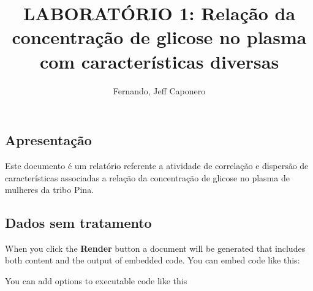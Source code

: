 \documentclass[
  letterpaper,
  DIV=11,
  numbers=noendperiod]{scrartcl}
\title{LABORATÓRIO 1: Relação da concentração de glicose no plasma com
características diversas}
\author{Fernando, Jeff Caponero}
\date{}
\begin{document}
\maketitle
\ifdefined\Shaded\renewenvironment{Shaded}{\begin{tcolorbox}[frame hidden, boxrule=0pt, enhanced, sharp corners, borderline west={3pt}{0pt}{shadecolor}, interior hidden, breakable]}{\end{tcolorbox}}\fi

\hypertarget{apresentauxe7uxe3o}{%
\subsection{Apresentação}\label{apresentauxe7uxe3o}}

Este documento é um relatório referente a atividade de correlação e
dispersão de características associadas a relação da concentração de
glicose no plasma de mulheres da tribo Pina.

\hypertarget{dados-sem-tratamento}{%
\subsection{Dados sem tratamento}\label{dados-sem-tratamento}}

When you click the \textbf{Render} button a document will be generated
that includes both content and the output of embedded code. You can
embed code like this:

You can add options to executable code like this
\end{document}
